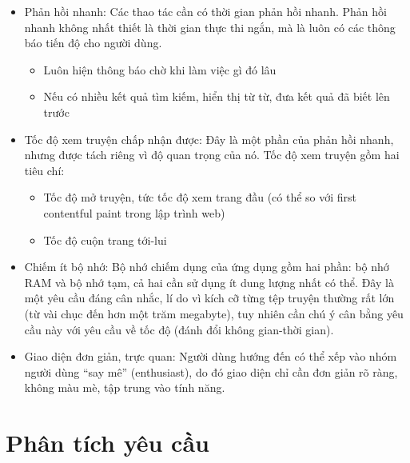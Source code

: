 \documentclass[../../thesis]{subfiles}
\begin{document}
\begin{itemize}
    \item
        Phản hồi nhanh: Các thao tác cần có thời gian phản hồi nhanh. Phản hồi
        nhanh không nhất thiết là thời gian thực thi ngắn, mà là luôn có các
        thông báo tiến độ cho người dùng.

        \begin{itemize}
            \item
                Luôn hiện thông báo chờ khi làm việc gì đó lâu
            \item
                Nếu có nhiều kết quả tìm kiếm, hiển thị từ từ, đưa kết quả đã
                biết lên trước
        \end{itemize}
    \item
        Tốc độ xem truyện chấp nhận được: Đây là một phần của phản hồi nhanh,
        nhưng được tách riêng vì độ quan trọng của nó. Tốc độ xem truyện gồm hai
        tiêu chí:

        \begin{itemize}
            \item
                Tốc độ mở truyện, tức tốc độ xem trang đầu (có thể so với first
                contentful paint trong lập trình web)
            \item
                Tốc độ cuộn trang tới-lui
        \end{itemize}
    \item
        Chiếm ít bộ nhớ: Bộ nhớ chiếm dụng của ứng dụng gồm hai phần: bộ nhớ RAM
        và bộ nhớ tạm, cả hai cần sử dụng ít dung lượng nhất có thể. Đây là một
        yêu cầu đáng cân nhắc, lí do vì kích cỡ từng tệp truyện thường rất lớn
        (từ vài chục đến hơn một trăm megabyte), tuy nhiên cần chú ý cân bằng
        yêu cầu này với yêu cầu về tốc độ (đánh đổi không gian-thời gian).
    \item
        Giao diện đơn giản, trực quan: Người dùng hướng đến có thể xếp vào nhóm
        người dùng ``say mê'' (enthusiast), do đó giao diện chỉ cần đơn giản rõ
        ràng, không màu mè, tập trung vào tính năng.
\end{itemize}



\section{Phân tích yêu cầu}\label{sec:analysis}
\end{document}

